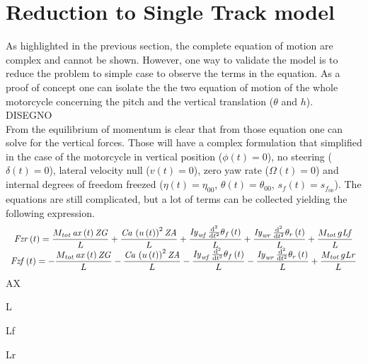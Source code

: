 \section{Reduction to Single Track model}
%
As highlighted in the previous section, the complete equation of motion are complex and cannot be shown. However, one way to validate the model is to reduce the problem to simple case to observe the terms in the equation. As a proof of concept one can isolate the the two equation of motion of the whole motorcycle concerning the pitch and the vertical translation ($\theta$ and $h$).\\
%
DISEGNO\\
%
From the equilibrium of momentum is clear that from those equation one can solve for the vertical forces. Those will have a complex formulation that simplified in the case of the motorcycle in vertical position ($\phi(t)=0$), no steering ($\delta(t)=0$), lateral velocity null ($v(t)=0$), zero yaw rate ($\Omega(t)=0$) and internal degrees of freedom freezed ($\eta(t)=\eta_00$, $\theta(t) = \theta_00$, $s_f(t)=s_{f_{00}}$). The equations are still complicated, but a lot of terms can be collected yielding the following expression.
%
\begin{equation}
\begin{array}{c} 
\displaystyle
{\it Fzr} \left( t \right) ={\frac {M_{{\it tot}}\,{\it ax} \left( t \right) {\it ZG}}{L}}+{\frac {{\it Ca}\,\left( u \left( t \right)  \right) ^{2}{\it ZA}}{L}}+{\frac {{\it Iy}_{{\it wf}}\,{\frac {{\rm d}^{2}}{{\rm d}{t}^{2}}}\theta_{f} \left( t \right) }{L}}+{\frac {{\it Iy}_{{\it wr}}\,{\frac {{\rm d}^{2}}{{\rm d}{t}^{2}}}\theta_{r} \left( t \right) }{L}}+{\frac {M_{{\it tot}}\,g{\it Lf}}{L}}\\
\displaystyle
{\it Fzf} \left( t \right) =-{\frac {M_{{\it tot}}\,{\it ax} \left( t \right) {\it ZG}}{L}}-{\frac {{\it Ca}\, \left( u \left( t \right)  \right) ^{2}{\it ZA}}{L}}-{\frac {{\it Iy}_{{\it wf}}\,{\frac {{\rm d}^{2}}{{\rm d}{t}^{2}}}\theta_{f} \left( t \right) }{L}}-{\frac {{\it Iy}_{{\it wr}}\,{\frac {{\rm d}^{2}}{{\rm d}{t}^{2}}}\theta_{r} \left( t \right) }{L}}+{\frac {M_{{\it tot}}\,g{\it Lr}}{L}}
\end{array}    
\end{equation}
%
AX

L

Lf 

Lr 



